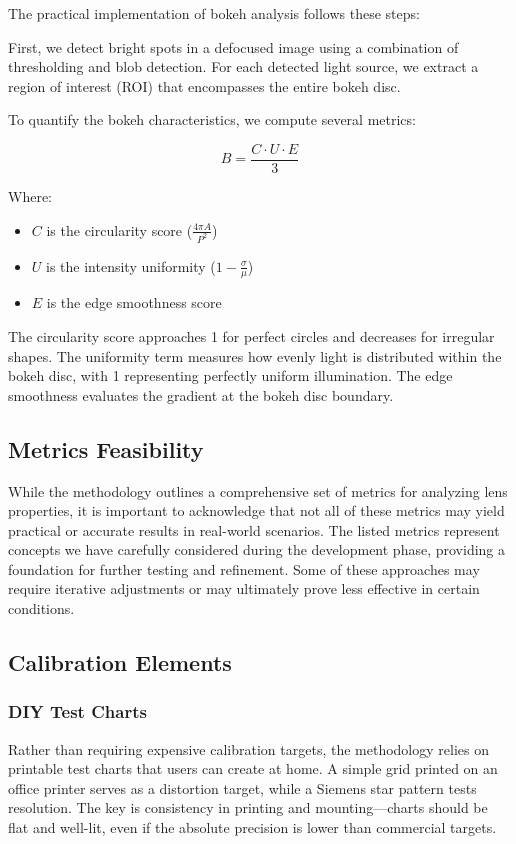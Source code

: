 The practical implementation of bokeh analysis follows these steps:

First, we detect bright spots in a defocused image using a combination of thresholding and blob detection. For each detected light source, we extract a region of interest (ROI) that encompasses the entire bokeh disc.

To quantify the bokeh characteristics, we compute several metrics:

\begin{equation}
B = \frac{C \cdot U \cdot E}{3}
\end{equation}

Where:
\begin{itemize}
    \item \( C \) is the circularity score (\( \frac{4\pi A}{P^2} \))
    \item \( U \) is the intensity uniformity (\( 1 - \frac{\sigma}{\mu} \))
    \item \( E \) is the edge smoothness score
\end{itemize}

The circularity score approaches 1 for perfect circles and decreases for irregular shapes. The uniformity term measures how evenly light is distributed within the bokeh disc, with 1 representing perfectly uniform illumination. The edge smoothness evaluates the gradient at the bokeh disc boundary.

\subsection{Metrics Feasibility}
While the methodology outlines a comprehensive set of metrics for analyzing lens properties, it is important to acknowledge that not all of these metrics may yield practical or accurate results in real-world scenarios. The listed metrics represent concepts we have carefully considered during the development phase, providing a foundation for further testing and refinement. Some of these approaches may require iterative adjustments or may ultimately prove less effective in certain conditions.

\subsection{Calibration Elements}
\subsubsection{DIY Test Charts}
Rather than requiring expensive calibration targets, the methodology relies on printable test charts that users can create at home. A simple grid printed on an office printer serves as a distortion target, while a Siemens star pattern tests resolution. The key is consistency in printing and mounting---charts should be flat and well-lit, even if the absolute precision is lower than commercial targets.

